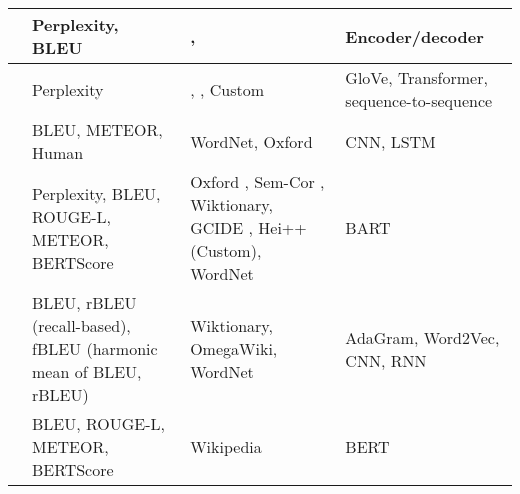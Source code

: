 \begin{longtable}{|p{3.5cm}|p{3.5cm}|p{3.5cm}|p{3.5cm}|}
    \hline
    \citeauthor*{washio_bridging_2019} \citeyear{washio_bridging_2019} \cite{washio_bridging_2019}                            & Perplexity, BLEU                                                 & \cite{noraset_definition_2016}, \cite{gadetsky_conditional_2018}                                                                              & Encoder/decoder                          \\
    \hline
    \citeauthor*{mickus_mark_2019} \citeyear{mickus_mark_2019} \cite{mickus_mark_2019}                                        & Perplexity                                                       & \cite{noraset_definition_2016}, \cite{gadetsky_conditional_2018}, Custom                                                                      & GloVe, Transformer, sequence-to-sequence \\
    \hline
    \citeauthor*{li_explicit_2020} \citeyear{li_explicit_2020} \cite{li_explicit_2020}                                        & BLEU, METEOR, Human                                              & WordNet, Oxford                                                                                                                               & CNN, LSTM                                \\
    \hline
    \citeauthor*{bevilacqua_generationary_2020} \citeyear{bevilacqua_generationary_2020} \cite{bevilacqua_generationary_2020} & Perplexity, BLEU, ROUGE-L, METEOR, BERTScore                     & Oxford \cite{chang_what_2019}, Sem-Cor \cite{miller_semantic_1993}, Wiktionary, GCIDE \cite{noraset_definition_2016}, Hei++ (Custom), WordNet & BART                                     \\
    \hline
    \citeauthor*{sojka_evaluating_2020} \citeyear{sojka_evaluating_2020} \cite{sojka_evaluating_2020}                         & BLEU, rBLEU (recall-based), fBLEU (harmonic mean of BLEU, rBLEU) & Wiktionary, OmegaWiki, WordNet                                                                                                                & AdaGram, Word2Vec, CNN, RNN              \\
    \hline
    \citeauthor*{huang_cdm_2021} \citeyear{huang_cdm_2021} \cite{huang_cdm_2021}                                              & BLEU, ROUGE-L, METEOR, BERTScore                                 & Wikipedia                                                                                                                                     & BERT                                     \\

\end{longtable}
